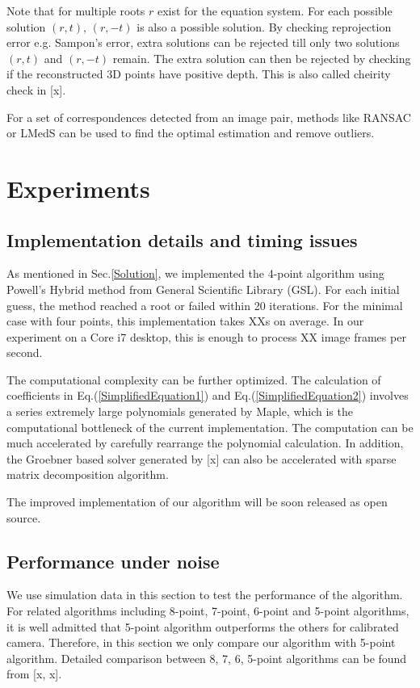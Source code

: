\documentclass[letterpaper, 10 pt, conference]{ieeeconf}
\begin{document}
Note that for multiple roots $r$ exist for the equation system. For each possible solution $(r, t)$, $(r, -t)$ is also a possible solution. By checking reprojection error e.g. Sampon's error, extra solutions can be rejected till only two solutions $(r, t)$ and $(r, -t)$ remain. The extra solution can then be rejected by checking if the reconstructed 3D points have positive depth. This is also called cheirity check in [x]. 

For a set of correspondences detected from an image pair, methods like RANSAC or LMedS can be used to find the optimal estimation and remove outliers. 

\section{Experiments}
\subsection{Implementation details and timing issues}
As mentioned in Sec.\ref{Solution}, we implemented the 4-point algorithm using Powell's Hybrid method from General Scientific Library (GSL). For each initial guess, the method reached a root or failed within 20 iterations. For the minimal case with four points, this implementation takes XXs on average. In our experiment on a Core i7 desktop, this is enough to process XX image frames per second. 

The computational complexity can be further optimized. The calculation of coefficients in Eq.(\ref{SimplifiedEquation1}) and Eq.(\ref{SimplifiedEquation2}) involves a series extremely large polynomials generated by Maple, which is the computational bottleneck of the current implementation. The computation can be much accelerated by carefully rearrange the polynomial calculation. In addition, the Groebner based solver generated by [x] can also be accelerated with sparse matrix decomposition algorithm. 

The improved implementation of our algorithm will be soon released as open source. 

\subsection{Performance under noise}
We use simulation data in this section to test the performance of the algorithm. For related algorithms including 8-point, 7-point, 6-point and 5-point algorithms, it is well admitted that 5-point algorithm outperforms the others for calibrated camera. Therefore, in this section we only compare our algorithm with 5-point algorithm. Detailed comparison between 8, 7, 6, 5-point algorithms can be found from [x, x]. 
\end{document}
